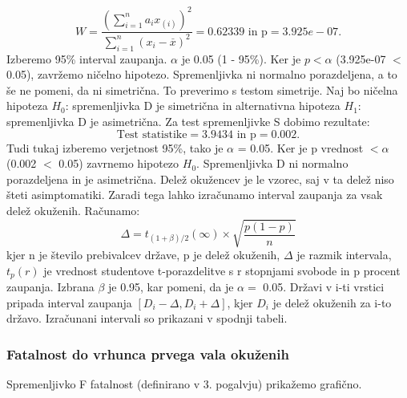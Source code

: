 \documentclass[a4paper,11pt]{article}
\begin{document}
\[W = \frac{(\sum_{i = 1}^{n}a_i x_{(i)})^2}{\sum_{i = 1}^{n}(x_i - \overset{\_}{x})^2} = 0.62339 \text{ in p} = 3.925e-07. \]
Izberemo 95\% interval zaupanja. \(\alpha\) je 0.05 (1 - 95\%). Ker je \(p < \alpha\) (3.925e-07 \(<\) 0.05), zavržemo ničelno hipotezo. Spremenljivka ni normalno porazdeljena, a to še ne pomeni, da ni simetrična. To preverimo s testom simetrije. Naj bo ničelna hipoteza \(H_0\): spremenljivka D je simetrična in alternativna hipoteza \(H_1\): spremenljivka D je asimetrična. Za test spremenljivke S dobimo rezultate:
\[\text{Test statistike} = 3.9434 \text{ in p} =  0.002.\]
Tudi tukaj izberemo verjetnost 95\%, tako je \(\alpha\) = 0.05. Ker je p vrednost \(< \alpha\) (0.002 \(<\) 0.05) zavrnemo hipotezo \(H_0\). Spremenljivka D ni normalno porazdeljena in je asimetrična. Delež okužencev je le vzorec, saj v ta delež niso šteti asimptomatiki. Zaradi tega lahko izračunamo interval zaupanja za vsak delež okuženih. Računamo:
\[\Delta = t_{(1 + \beta) /2}(\infty) \times \sqrt{\frac{p(1 - p)}{n}}\]
kjer n je število prebivalcev države, p je delež okuženih, \(\Delta\) je razmik intervala, \(t_{p}(r)\) je vrednost studentove t-porazdelitve s r stopnjami svobode in p procent zaupanja. Izbrana \(\beta\) je 0.95, kar pomeni, da je \(\alpha = \) 0.05. Državi v i-ti vrstici pripada interval zaupanja \([D_i - \Delta, D_i + \Delta]\), kjer \(D_i\) je delež okuženih za i-to državo. Izračunani intervali so prikazani v spodnji tabeli.
\begin{center}
\end{center}

\subsubsection{Fatalnost do vrhunca prvega vala okuženih}
Spremenljivko F fatalnost (definirano v 3. pogalvju) prikažemo grafično.
\end{document}
